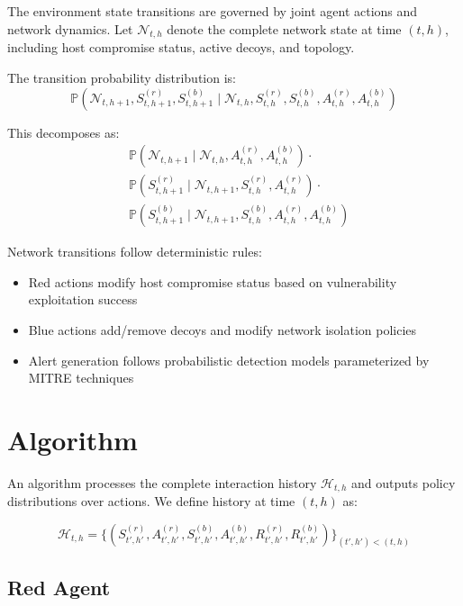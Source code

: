 \documentclass[11pt]{article}
\theoremstyle{definition}
\theoremstyle{plain}
\newcommand{\MC}[1]{\mathcal{#1}}
\newcommand{\PP}{\mathbb{P}}
\begin{document}
The environment state transitions are governed by joint agent actions and network dynamics. Let $\MC{N}_{t,h}$ denote the complete network state at time $(t,h)$, including host compromise status, active decoys, and topology.

The transition probability distribution is:
\begin{equation}
\PP(\MC{N}_{t,h+1}, S_{t,h+1}^{(r)}, S_{t,h+1}^{(b)} \mid \MC{N}_{t,h}, S_{t,h}^{(r)}, S_{t,h}^{(b)}, A_{t,h}^{(r)}, A_{t,h}^{(b)})
\end{equation}

This decomposes as:
\begin{align}
&\PP(\MC{N}_{t,h+1} \mid \MC{N}_{t,h}, A_{t,h}^{(r)}, A_{t,h}^{(b)}) \cdot \\
&\PP(S_{t,h+1}^{(r)} \mid \MC{N}_{t,h+1}, S_{t,h}^{(r)}, A_{t,h}^{(r)}) \cdot \\
&\PP(S_{t,h+1}^{(b)} \mid \MC{N}_{t,h+1}, S_{t,h}^{(b)}, A_{t,h}^{(r)}, A_{t,h}^{(b)})
\end{align}

Network transitions follow deterministic rules:
\begin{itemize}
    \item Red actions modify host compromise status based on vulnerability exploitation success
    \item Blue actions add/remove decoys and modify network isolation policies
    \item Alert generation follows probabilistic detection models parameterized by MITRE techniques
\end{itemize}

\section{Algorithm}

An algorithm processes the complete interaction history $\MC{H}_{t,h}$ and outputs policy distributions over actions. We define history at time $(t,h)$ as:

\begin{equation}
\MC{H}_{t,h} = \{(S_{t',h'}^{(r)}, A_{t',h'}^{(r)}, S_{t',h'}^{(b)}, A_{t',h'}^{(b)}, R_{t',h'}^{(r)}, R_{t',h'}^{(b)})\}_{(t',h') < (t,h)}
\end{equation}

\subsection{Red Agent}
\end{document}
